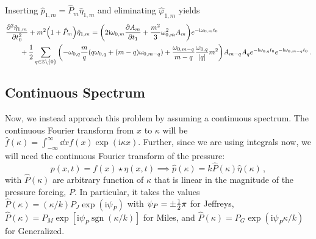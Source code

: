 \documentclass{jfm}
\let\Oldsubsection\subsection
\renewcommand{\subsection}{\FloatBarrier\Oldsubsection}
\newcommand{\GenP}{\hat{P}_m}
\newcommand{\GenPk}{\hat{P}(\kappa)}
\DeclareMathOperator{\sgn}{sgn}
\newcommand{\im}{\mathrm{i}}
\begin{document}
Inserting $\hat{p}_{1,m} = \GenP \hat{\eta}_{1,m}$ and eliminating
$\hat{\varphi}_{1,m}$ yields
\begin{gather}
  \begin{aligned}
    &\pdv[2]{\hat{\eta}_{1,m}}{t_0} + m^2 \pqty{1+\GenP} \hat{\eta}_{1,m}
      = \pqty{ 2 \im \omega_{0,m} \pdv{A_m}{t_1} + \frac{m^2}{3}
      \omega_{0,m}^2 A_m } e^{-\im \omega_{0,m} t_0} \\
    &\qquad
      + \frac{1}{2} \sum_{q \in \mathbb{Z} \setminus \{0\}}
      \pqty{ -\omega_{0,q} \frac{m}{q} (q \omega_{0,q} + (m-q)
        \omega_{0,m-q})
      + \frac{\omega_{0,m-q}}{m-q} \frac{\omega_{0,q}}{\abs{q}} m^2
      }
      A_{m-q} A_q e^{-\im \omega_{0,q} t_0}
      e^{-\im \omega_{0,m-q} t_0}
    \,.
  \end{aligned}
\end{gather}

\subsection{Continuous Spectrum}
Now, we instead approach this problem by assuming a continuous spectrum.
The continuous Fourier transform from $x$ to $\kappa$
will be $\hat{f}(\kappa) = \int_{-\infty}^{\infty} \dd{x} f(x) \exp(\im \kappa
x)$.
Further, since we are using integrals now, we will need the continuous
Fourier transform of the pressure:
\[
  p(x,t) = f(x) \star \eta(x,t) \implies \hat{p}(\kappa) = k \GenPk
    \hat{\eta}(\kappa) \,,
\]
with $\GenPk$ are arbitrary function of $\kappa$ that is linear in the
magnitude of the pressure forcing, $P$.
In particular, it takes the values $\GenPk = (\kappa/k) P_J \exp(\im \psi_P)$ with
$\psi_P = \pm {\textstyle\frac{1}{2}} \pi$ for Jeffreys, $\GenPk = P_M \exp[\im
\psi_P \sgn(\kappa/k)]$ for Miles, and $\GenPk = P_G \exp(\im \psi_P
\kappa/k)$ for Generalized.
\end{document}
